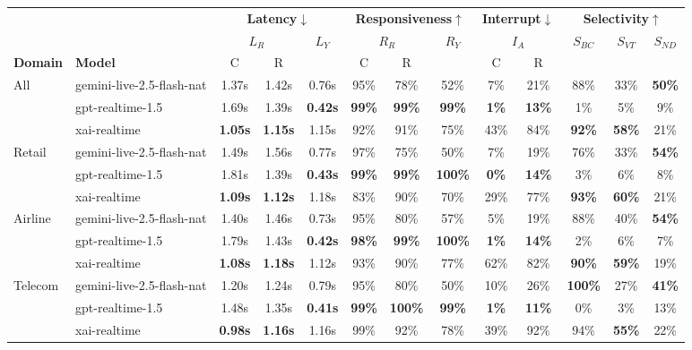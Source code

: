 \begin{tabular}{@{}ll|cc|c|cc|c|cc|ccc@{}}
\toprule
 & & \multicolumn{3}{c|}{\textbf{Latency}$\downarrow$} & \multicolumn{3}{c|}{\textbf{Responsiveness}$\uparrow$} & \multicolumn{2}{c|}{\textbf{Interrupt}$\downarrow$} & \multicolumn{3}{c}{\textbf{Selectivity}$\uparrow$} \\
 & & \multicolumn{2}{c|}{$L_R$} & \multirow{2}{*}{$L_Y$} & \multicolumn{2}{c|}{$R_R$} & \multirow{2}{*}{$R_Y$} & \multicolumn{2}{c|}{$I_A$} & \multirow{2}{*}{$S_{BC}$} & \multirow{2}{*}{$S_{VT}$} & \multirow{2}{*}{$S_{ND}$} \\
\textbf{Domain} & \textbf{Model} & C & R & & C & R & & C & R & & & \\
\midrule
\multirow{3}{*}{All} & gemini-live-2.5-flash-nat & 1.37s & 1.42s & 0.76s & 95\% & 78\% & 52\% & 7\% & 21\% & 88\% & 33\% & \textbf{50\%} \\
 & gpt-realtime-1.5 & 1.69s & 1.39s & \textbf{0.42s} & \textbf{99\%} & \textbf{99\%} & \textbf{99\%} & \textbf{1\%} & \textbf{13\%} & 1\% & 5\% & 9\% \\
 & xai-realtime & \textbf{1.05s} & \textbf{1.15s} & 1.15s & 92\% & 91\% & 75\% & 43\% & 84\% & \textbf{92\%} & \textbf{58\%} & 21\% \\
\midrule
\multirow{3}{*}{Retail} & gemini-live-2.5-flash-nat & 1.49s & 1.56s & 0.77s & 97\% & 75\% & 50\% & 7\% & 19\% & 76\% & 33\% & \textbf{54\%} \\
 & gpt-realtime-1.5 & 1.81s & 1.39s & \textbf{0.43s} & \textbf{99\%} & \textbf{99\%} & \textbf{100\%} & \textbf{0\%} & \textbf{14\%} & 3\% & 6\% & 8\% \\
 & xai-realtime & \textbf{1.09s} & \textbf{1.12s} & 1.18s & 83\% & 90\% & 70\% & 29\% & 77\% & \textbf{93\%} & \textbf{60\%} & 21\% \\
\midrule
\multirow{3}{*}{Airline} & gemini-live-2.5-flash-nat & 1.40s & 1.46s & 0.73s & 95\% & 80\% & 57\% & 5\% & 19\% & 88\% & 40\% & \textbf{54\%} \\
 & gpt-realtime-1.5 & 1.79s & 1.43s & \textbf{0.42s} & \textbf{98\%} & \textbf{99\%} & \textbf{100\%} & \textbf{1\%} & \textbf{14\%} & 2\% & 6\% & 7\% \\
 & xai-realtime & \textbf{1.08s} & \textbf{1.18s} & 1.12s & 93\% & 90\% & 77\% & 62\% & 82\% & \textbf{90\%} & \textbf{59\%} & 19\% \\
\midrule
\multirow{3}{*}{Telecom} & gemini-live-2.5-flash-nat & 1.20s & 1.24s & 0.79s & 95\% & 80\% & 50\% & 10\% & 26\% & \textbf{100\%} & 27\% & \textbf{41\%} \\
 & gpt-realtime-1.5 & 1.48s & 1.35s & \textbf{0.41s} & \textbf{99\%} & \textbf{100\%} & \textbf{99\%} & \textbf{1\%} & \textbf{11\%} & 0\% & 3\% & 13\% \\
 & xai-realtime & \textbf{0.98s} & \textbf{1.16s} & 1.16s & 99\% & 92\% & 78\% & 39\% & 92\% & 94\% & \textbf{55\%} & 22\% \\
\bottomrule
\end{tabular}